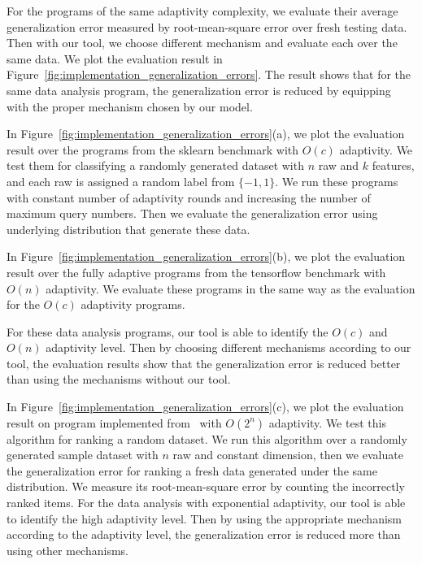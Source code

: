 

For the programs of the same adaptivity complexity, we evaluate their average generalization error measured by root-mean-square error over fresh testing data.
Then with our tool, we choose different mechanism and evaluate each over the same data.
We plot the evaluation result in Figure~\ref{fig:implementation_generalization_errors}.
The result shows that for the same data analysis program, the generalization error is reduced
by equipping with the proper mechanism chosen by our model.




In Figure~\ref{fig:implementation_generalization_errors}(a), we plot the evaluation result over the
programs from the sklearn benchmark with $O(c)$ adaptivity.
We test them for classifying a randomly generated dataset with $n$ raw and $k$ features, and each raw is
assigned a random label from $\{-1, 1\}$.
We run these programs with constant number of adaptivity rounds and increasing the number of
maximum query numbers.
Then we evaluate the generalization error using underlying distribution that generate these data.


In Figure~\ref{fig:implementation_generalization_errors}(b), we plot the 
evaluation result over the fully adaptive
programs from the tensorflow benchmark with $O(n)$ adaptivity.
We evaluate these programs in the same way as the evaluation for the $O(c)$ adaptivity programs.

For these data analysis programs,
our tool is able to identify the $O(c)$ and $O(n)$ adaptivity level.
Then by choosing different mechanisms according to our tool,
the evaluation results show that the generalization error is reduced better than 
using the mechanisms without our tool.

In Figure~\ref{fig:implementation_generalization_errors}(c), we plot the 
evaluation result on
program implemented from~\cite{Jamieson2015TheAO} with $O(2^n)$ adaptivity.
We test this algorithm for ranking a random dataset. 
We run this algorithm over a randomly generated sample dataset with $n$ raw and constant dimension,
then we evaluate the generalization error for ranking
a fresh data generated under the same distribution.
We measure its root-mean-square error by counting the incorrectly ranked items.
For the data analysis with exponential adaptivity, our tool is able to identify the high adaptivity level.
Then by using the appropriate mechanism according to the adaptivity level,
the generalization error is reduced more than using other mechanisms.


